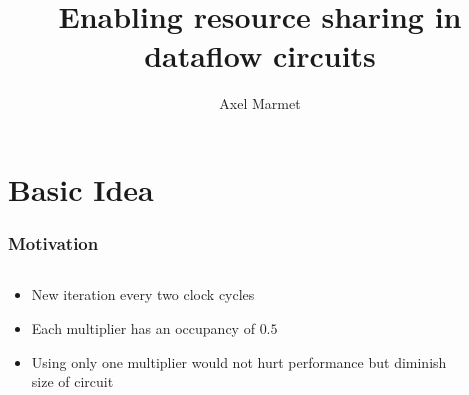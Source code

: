 \documentclass{beamer}
\title[Resource Sharing] %
{Enabling resource sharing in dataflow circuits}
\author[Marmet] %
{Axel Marmet}
\institute[EPFL] %
\date[EPFL 2019] %
\begin{document}
\frame{\titlepage}



\section{Basic Idea}
\begin{frame}[fragile]
\frametitle{Motivation}
\begin{columns}[T]
    \begin{column}{0.45\textwidth}
      \begin{itemize}
          \item New iteration every two clock cycles
          \item Each multiplier has an occupancy of $0.5$
          \item Using only one multiplier would not hurt performance but diminish size of circuit
      \end{itemize}
    \end{column}
    \begin{column}{0.1\textwidth}
    \end{column}
    \begin{column}{0.45\textwidth}

\end{column}
\end{columns}
\end{frame}
\end{document}
